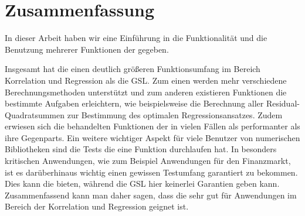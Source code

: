 \section{Zusammenfassung}

In dieser Arbeit haben wir eine Einführung in die Funktionalität und die Benutzung mehrerer Funktionen der \naglib gegeben.

Insgesamt hat die \naglib einen deutlich größeren Funktionsumfang im Bereich Korrelation und Regression als die GSL.
Zum einen werden mehr verschiedene Berechnungsmethoden unterstützt und zum anderen existieren Funktionen die bestimmte Aufgaben erleichtern, wie beispielsweise die Berechnung aller Residual-Quadratsummen zur Bestimmung des optimalen Regressionsansatzes.
Zudem erwiesen sich die behandelten Funktionen der \naglib in vielen Fällen als performanter als ihre Gegenparts.
Ein weitere wichtiger Aspekt für viele Benutzer von numerischen Bibliotheken sind die Tests die eine Funktion durchlaufen hat.
In besonders kritischen Anwendungen, wie zum Beispiel Anwendungen für den Finanzmarkt, ist es darüberhinaus wichtig einen gewissen Testumfang garantiert zu bekommen.
Dies kann die \naglib bieten, während die GSL hier keinerlei Garantien geben kann. 
Zusammenfassend kann man daher sagen, dass die \naglib sehr gut für Anwendungen im Bereich der Korrelation und Regression geignet ist.


